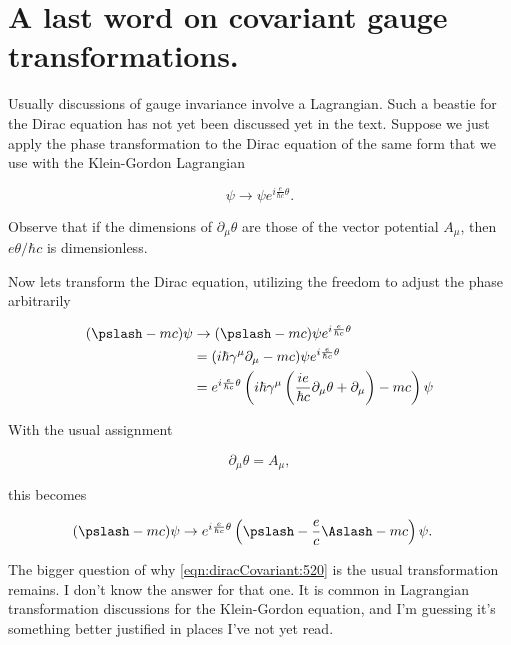 \section{A last word on covariant gauge transformations.}

Usually discussions of gauge invariance involve a Lagrangian.  Such a beastie for the Dirac equation has not yet been discussed yet in the text.  Suppose we just apply the phase transformation to the Dirac equation of the same form that we use with the Klein-Gordon Lagrangian

\begin{equation}\label{eqn:diracCovariant:500}
\psi \rightarrow \psi e^{i \frac{e }{\hbar c} \theta}.
\end{equation}

Observe that if the dimensions of $\partial_\mu \theta$ are those of the vector potential $A_\mu$, then $e \theta/\hbar c$ is dimensionless.

Now lets transform the Dirac equation, utilizing the freedom to adjust the phase arbitrarily

\begin{align*}
(\pslash - m c) \psi
&\rightarrow
(\pslash - m c )\psi e^{i \frac{e}{\hbar c} \theta } \\
&=
(i \hbar \gamma^\mu \partial_\mu - m c) \psi e^{i \frac{e}{\hbar c} \theta } \\
&=
e^{i \frac{e}{\hbar c} \theta } 
\left(
i \hbar \gamma^\mu \left( \frac{ i e }{\hbar c} \partial_\mu \theta + \partial_\mu \right)  - m c
\right) \psi \\
\end{align*}

With the usual assignment 

\begin{equation}\label{eqn:diracCovariant:520}
\partial_\mu \theta = A_\mu,
\end{equation}

this becomes

\begin{align*}
(\pslash - m c) \psi
&\rightarrow
e^{i \frac{e}{\hbar c} \theta } 
\left(
\pslash - \frac{e}{c} \Aslash - m c
\right) \psi.
\end{align*}

The bigger question of why \ref{eqn:diracCovariant:520} is the usual transformation remains.  I don't know the answer for that one.  It is common in Lagrangian transformation discussions for the Klein-Gordon equation, and I'm guessing it's something better justified in places I've not yet read.

